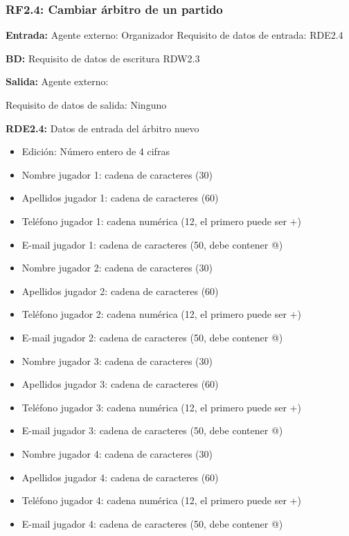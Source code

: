 \subsubsection{RF2.4: Cambiar árbitro de un partido}
\textbf{Entrada:} Agente externo: Organizador        Requisito de datos de entrada: RDE2.4

\textbf{BD:} Requisito de datos de  escritura RDW2.3

\textbf{Salida:} Agente externo:

Requisito de datos de salida: Ninguno

\textbf{RDE2.4:} Datos de entrada del árbitro nuevo
\begin{itemize}
	\item Edición: Número entero de 4 cifras
\newline
	\item Nombre jugador 1: cadena de caracteres (30)
	\item Apellidos jugador 1: cadena de caracteres (60)
	\item Teléfono jugador 1: cadena numérica (12, el primero puede ser +)
	\item E-mail jugador 1: cadena de caracteres (50, debe contener @)
\newline
	\item Nombre jugador 2: cadena de caracteres (30)
	\item Apellidos jugador 2: cadena de caracteres (60)
	\item Teléfono jugador 2: cadena numérica (12, el primero puede ser +)
	\item E-mail jugador 2: cadena de caracteres (50, debe contener @)
\newline
	\item Nombre jugador 3: cadena de caracteres (30)
	\item Apellidos jugador 3: cadena de caracteres (60)
	\item Teléfono jugador 3: cadena numérica (12, el primero puede ser +)
	\item E-mail jugador 3: cadena de caracteres (50, debe contener @)
\newline
	\item Nombre jugador 4: cadena de caracteres (30)
	\item Apellidos jugador 4: cadena de caracteres (60)
	\item Teléfono jugador 4: cadena numérica (12, el primero puede ser +)
	\item E-mail jugador 4: cadena de caracteres (50, debe contener @)
\newline

\end{itemize}
